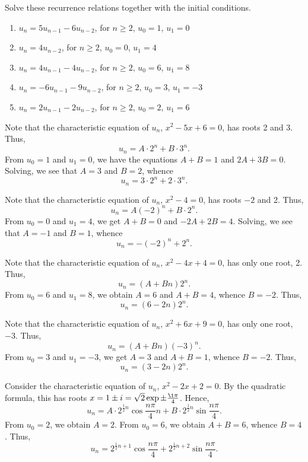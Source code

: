 \begin{problem}
    Solve these recurrence relations together with the initial conditions.
        
    \begin{enumerate}
        \item $u_n = 5u_{n-1} - 6u_{n-2}$, for $n \geq 2$, $u_0 = 1$, $u_1 = 0$
        \item $u_n = 4u_{n-2}$, for $n \geq 2$, $u_0 = 0$, $u_1 = 4$
        \item $u_n = 4u_{n-1} - 4u_{n-2}$, for $n \geq 2$, $u_0 = 6$, $u_1 = 8$
        \item $u_n = -6u_{n-1} - 9u_{n-2}$, for $n \geq 2$, $u_0 = 3$, $u_1 = -3$
        \item $u_n = 2u_{n-1} - 2u_{n-2}$, for $n \geq 2$, $u_0 = 2$, $u_1 = 6$
    \end{enumerate}
\end{problem}
\begin{solution}
    \begin{ppart}
        Note that the characteristic equation of $u_n$, $x^2 - 5x + 6 = 0$, has roots 2 and 3. Thus, \[u_n = A\cdot2^n + B\cdot3^n.\] From $u_0 = 1$ and $u_1 = 0$, we have the equations $A + B = 1$ and $2A + 3B = 0$. Solving, we see that $A = 3$ and $B = 2$, whence \[u_n = 3 \cdot 2^n + 2 \cdot 3^n.\]
    \end{ppart}
    \begin{ppart}
        Note that the characteristic equation of $u_n$, $x^2 - 4 = 0$, has roots $-2$ and 2. Thus, \[u_n = A(-2)^n + B\cdot2^n.\] From $u_0 = 0$ and $u_1 = 4$, we get $A + B = 0$ and $-2A + 2B = 4$. Solving, we see that $A = -1$ and $B = 1$, whence \[u_n = -(-2)^n + 2^n.\]
    \end{ppart}
    \begin{ppart}
        Note that the characteristic equation of $u_n$, $x^2 - 4x + 4 = 0$, has only one root, 2. Thus, \[u_n = (A + Bn)2^n.\] From $u_0 = 6$ and $u_1 = 8$, we obtain $A = 6$ and $A + B = 4$, whence $B = -2$. Thus, \[u_n = (6 - 2n)2^n.\]
    \end{ppart}
    \begin{ppart}
        Note that the characteristic equation of $u_n$, $x^2 + 6x + 9 = 0$, has only one root, $-3$. Thus, \[u_n = (A + Bn)(-3)^n.\] From $u_0 = 3$ and $u_1 = -3$, we get $A = 3$ and $A + B = 1$, whence $B = -2$. Thus, \[u_n = (3 - 2n)2^n.\]
    \end{ppart}
    \begin{ppart}
        Consider the characteristic equation of $u_n$, $x^2 - 2x + 2 = 0$. By the quadratic formula, this has roots $x = 1 \pm i = \sqrt{2} \exp{\pm \frac{\i\pi}4}$. Hence, \[u_n = A \cdot 2^{\frac12 n} \cos{\frac{n\pi}4 n } + B \cdot 2^{\frac12 n} \sin{\frac{n\pi}4}.\] From $u_0 = 2$, we obtain $A = 2$. From $u_0 = 6$, we obtain $A + B = 6$, whence $B = 4$. Thus, \[u_n = 2^{\frac12 n + 1} \cos{\frac{n\pi}4} + 2^{\frac12 n + 2} \sin{\frac{n\pi}4}.\]
    \end{ppart}
\end{solution}

